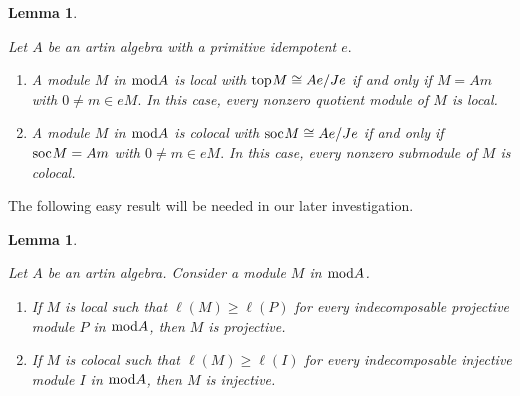\documentclass[10pt]{amsart}
\newtheorem{Lemma}[Theo]{Lemma}
\theoremstyle{definition}
\newcommand{\mmod}{{\rm mod}}
\newcommand{\soc}{{\rm soc}\hspace{.5pt}}
\newcommand{\ntop}{{\rm top}\hspace{.5pt}}
\begin{document}
\begin{Lemma}\label{loc_gen}

Let $A$ be an artin algebra with a primitive idempotent $e.$ 

\begin{enumerate}[$(1)$]

\vspace{-2pt}

\item A module $M$ in $\mmod A$ is local with $\ntop M \cong Ae/Je$ if and only if $M=Am$ with $0\ne m\in eM.$ In this case, every nonzero quotient module of $M$ is local.

\item A module $M$ in $\mmod A$ is colocal with $\soc M\cong Ae/Je$ if and only if $\soc M=Am$ with $0\ne m\in eM.$ In this case, every nonzero submodule of $M$ is colocal.

\end{enumerate} \end{Lemma}


\smallskip

 The following easy result will be needed in our later investigation.

 \vspace{-1pt}

\begin{Lemma}\label{maxi_local}

Let $A$ be an artin algebra.  Consider a module $M$ in $\mmod A$.

\begin{enumerate}[$(1)$]

\vspace{-2pt}

\item If $M$ is local such that $\ell(M)\ge \ell(P)$ for every indecomposable projective module $P$ in $\mmod A$, then $M$ is projective.

\item If $M$ is colocal such that $\ell(M)\ge \ell(I)$ for every indecomposable injective module $I$ in $\mmod A$, then $M$ is injective.
    
\end{enumerate} \end{Lemma}
\end{document}
